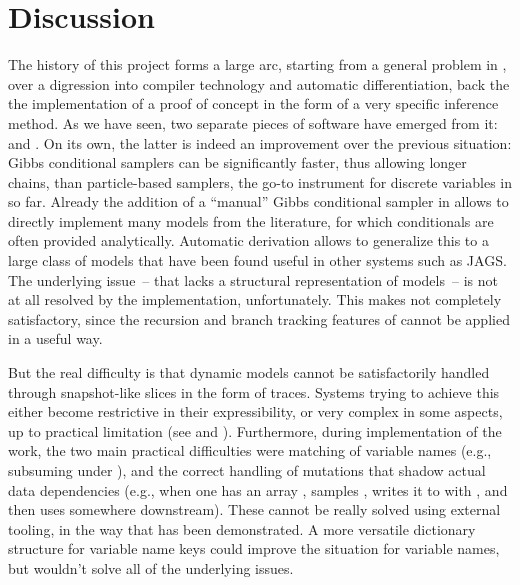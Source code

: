 \chapter{Discussion}
\label{cha:discussion}

The history of this project forms a large arc, starting from a general problem in \turingjl{}, over
a digression into compiler technology and automatic differentiation, back the the implementation of
a proof of concept in the form of a very specific inference method.  As we have seen, two separate
pieces of software have emerged from it: \irtrackerjl{} and \autogibbsjl{}.  On its own, the latter
is indeed an improvement over the previous situation: Gibbs conditional samplers can be
significantly faster, thus allowing longer chains, than particle-based samplers, the go-to
instrument for discrete variables in \turingjl{} so far.  Already the addition of a \enquote{manual}
Gibbs conditional sampler in \turingjl{} allows to directly implement many models from the
literature, for which conditionals are often provided analytically.  Automatic derivation allows to
generalize this to a large class of models that have been found useful in other systems such as
JAGS.  The underlying issue~-- that \turingjl{} lacks a structural representation of models~-- is
not at all resolved by the implementation, unfortunately.  This makes \autogibbsjl{} not completely
satisfactory, since the recursion and branch tracking features of \irtrackerjl{} cannot be applied
in a useful way.

But the real difficulty is that dynamic models cannot be satisfactorily handled through
snapshot-like slices in the form of traces.  Systems trying to achieve this either become
restrictive in their expressibility, or very complex in some aspects, up to practical limitation
(see \textcite{mansinghka2014venture} and \textcite{goodman2012church}).  Furthermore, during
implementation of the work, the two main practical difficulties were matching of variable names
(e.g., subsuming  under ), and the correct handling of mutations
that shadow actual data dependencies (e.g., when one has an array , samples ,
writes it to  with , and then uses  somewhere
downstream).  These cannot be really solved using external tooling, in the way that has been
demonstrated.  A more versatile dictionary structure for variable name keys could improve the
situation for variable names, but wouldn't solve all of the underlying issues.

